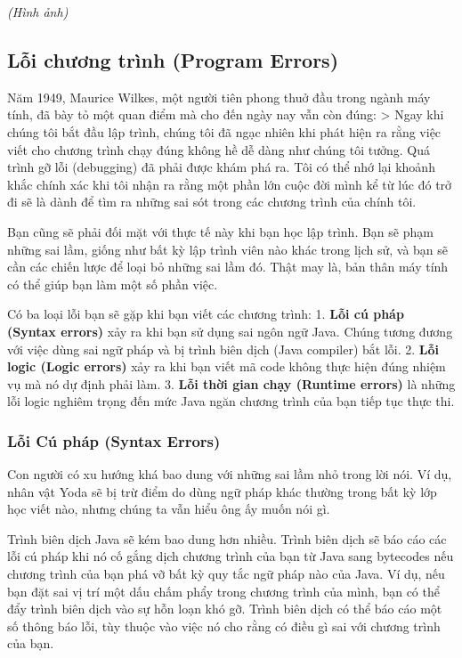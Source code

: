 \emph{(Hình ảnh)}

\subsection{Lỗi chương trình (Program
Errors)}\label{lux1ed7i-chux1b0ux1a1ng-truxecnh-program-errors}

Năm 1949, Maurice Wilkes, một người tiên phong thuở đầu trong ngành máy
tính, đã bày tỏ một quan điểm mà cho đến ngày nay vẫn còn đúng:
\textgreater{} Ngay khi chúng tôi bắt đầu lập trình, chúng tôi đã ngạc
nhiên khi phát hiện ra rằng việc viết cho chương trình chạy đúng không
hề dễ dàng như chúng tôi tưởng. Quá trình gỡ lỗi (debugging) đã phải
được khám phá ra. Tôi có thể nhớ lại khoảnh khắc chính xác khi tôi nhận
ra rằng một phần lớn cuộc đời mình kể từ lúc đó trở đi sẽ là dành để tìm
ra những sai sót trong các chương trình của chính tôi.

Bạn cũng sẽ phải đối mặt với thực tế này khi bạn học lập trình. Bạn sẽ
phạm những sai lầm, giống như bất kỳ lập trình viên nào khác trong lịch
sử, và bạn sẽ cần các chiến lược để loại bỏ những sai lầm đó. Thật may
là, bản thân máy tính có thể giúp bạn làm một số phần việc.

Có ba loại lỗi bạn sẽ gặp khi bạn viết các chương trình: 1. \textbf{Lỗi
cú pháp (Syntax errors)} xảy ra khi bạn sử dụng sai ngôn ngữ Java. Chúng
tương đương với việc dùng sai ngữ pháp và bị trình biên dịch (Java
compiler) bắt lỗi. 2. \textbf{Lỗi logic (Logic errors)} xảy ra khi bạn
viết mã code không thực hiện đúng nhiệm vụ mà nó dự định phải làm. 3.
\textbf{Lỗi thời gian chạy (Runtime errors)} là những lỗi logic nghiêm
trọng đến mức Java ngăn chương trình của bạn tiếp tục thực thi.

\subsubsection{Lỗi Cú pháp (Syntax
Errors)}\label{lux1ed7i-cuxfa-phuxe1p-syntax-errors}

Con người có xu hướng khá bao dung với những sai lầm nhỏ trong lời nói.
Ví dụ, nhân vật Yoda sẽ bị trừ điểm do dùng ngữ pháp khác thường trong
bất kỳ lớp học viết nào, nhưng chúng ta vẫn hiểu ông ấy muốn nói gì.

Trình biên dịch Java sẽ kém bao dung hơn nhiều. Trình biên dịch sẽ báo
cáo các lỗi cú pháp khi nó cố gắng dịch chương trình của bạn từ Java
sang bytecodes nếu chương trình của bạn phá vỡ bất kỳ quy tắc ngữ pháp
nào của Java. Ví dụ, nếu bạn đặt sai vị trí một dấu chấm phẩy trong
chương trình của mình, bạn có thể đẩy trình biên dịch vào sự hỗn loạn
khó gỡ. Trình biên dịch có thể báo cáo một số thông báo lỗi, tùy thuộc
vào việc nó cho rằng có điều gì sai với chương trình của bạn.

